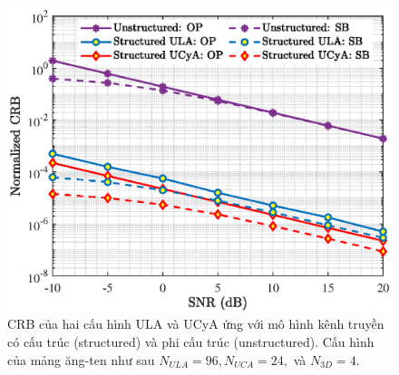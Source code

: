 \begin{figure}[!b]
    \centering
    \includegraphics[width=\linewidth]{figures/fig_1_3.eps}
    \caption{CRB của hai cấu hình ULA và UCyA ứng với mô hình kênh truyền có cấu trúc (structured) và phi cấu trúc (unstructured). Cấu hình của mảng ăng-ten như sau $N_{ULA} = 96, N_{UCA} = 24,$ và $N_{3D} = 4$.}
    \label{fig:op}
\end{figure}

